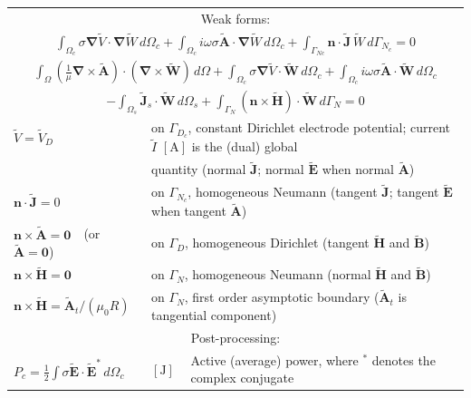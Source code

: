\documentclass[letterpaper]{article}
\newcommand{\vect}[1]{\mathbf#1}
\newcommand{\vecp}[1]{\tilde{\mathbf#1}}
\newcommand{\nab}{\vect{\nabla}}
\begin{document}
\begin{table}[h!]
\begin{tabular}{lll}
\multicolumn{3}{c}{Weak forms:} \\[1pt]
\multicolumn{3}{c}{$\displaystyle
\int_{\Omega_c}\sigma\nab \tilde{V}\cdot\nab \tilde{W}\,d\Omega_c
+\int_{\Omega_c} i\omega\sigma\vecp{A}\cdot\nab \tilde{W}\,d\Omega_c
+\int_{\Gamma_{Nc}}\vect{n}\cdot\vecp{J}\,\tilde{W}\,d{\Gamma_{N_c}}=0$}\\[8pt]
\multicolumn{3}{c}{$\displaystyle
\int_\Omega\left(\frac{1}{\mu}\nab\times\vecp{A}\right)\cdot(\nab\times\vecp{W})\,d\Omega
+\int_{\Omega_c}\sigma\nab \tilde{V}\cdot\vecp{W}\,d\Omega_c
+\int_{\Omega_c} i\omega\sigma\vecp{A}\cdot\vecp{W}\,d\Omega_c$}\hspace{4cm}\\
\multicolumn{3}{c}{\hspace{7.5cm}$\displaystyle
-\int_{\Omega_s}\vecp{J}_s\cdot\vecp{W}\,d\Omega_s
+\int_{\Gamma_N}(\vect{n}\times\vecp{H})\cdot\vecp{W}\,d{\Gamma_N}=0$}\\[9pt]
$\tilde{V}=\tilde{V}_D$ & \multicolumn{2}{l}{on $\Gamma_{D_c}$, constant Dirichlet electrode potential; current $\tilde{I}$ $[\text{A}]$ is the (dual) global}\\
 & \multicolumn{2}{l}{quantity (normal $\vecp{J}$; normal $\vecp{E}$ when normal $\vecp{A}$)}\\
$\vect{n}\cdot\vecp{J}=0$ & \multicolumn{2}{l}{on $\Gamma_{N_c}$, homogeneous Neumann (tangent $\vecp{J}$; tangent $\vecp{E}$ when tangent $\vecp{A}$)}\\
$\vect{n}\times\vecp{A}=\vect{0}$~~(or $\vecp{A}=\vect{0}$) & \multicolumn{2}{l}{on $\Gamma_D$, homogeneous Dirichlet (tangent $\vecp{H}$ and $\vecp{B}$)}\\
$\vect{n}\times\vecp{H}=\vect{0}$ & \multicolumn{2}{l}{on $\Gamma_N$, homogeneous Neumann (normal $\vecp{H}$ and $\vecp{B}$)}\\
$\vect{n}\times\vecp{H}=\vecp{A}_t/(\mu_0 R)$ & \multicolumn{2}{l}{on $\Gamma_N$, first order asymptotic boundary ($\vecp{A}_t$ is tangential component)}\\

\hline
\multicolumn{3}{c}{Post-processing:} \\
$P_c=\frac{1}{2}\int\sigma \vecp{E}\cdot\vecp{E}^*\,d\Omega_c$ & $[\text{J}]$ & Active (average) power, where $^*$ denotes the complex conjugate\\[1pt]

\hline
\end{tabular}
\end{table}
\end{document}
